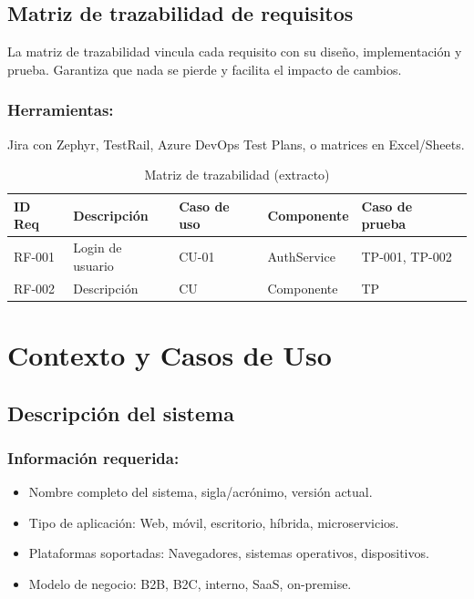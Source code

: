 \documentclass[a4paper,11pt,spanish]{article}
\begin{document}
\subsection{Matriz de trazabilidad de requisitos}

La matriz de trazabilidad vincula cada requisito con su diseño, implementación y prueba. Garantiza que nada se pierde y facilita el impacto de cambios.

\subsubsection*{Herramientas:} Jira con Zephyr, TestRail, Azure DevOps Test Plans, o matrices en Excel/Sheets.

\begin{table}[H]
\centering
\caption{Matriz de trazabilidad (extracto)}
\label{tab:trazabilidad}
\begin{tabular}{@{}lllll@{}}
\toprule
\textbf{ID Req} & \textbf{Descripción} & \textbf{Caso de uso} & \textbf{Componente} & \textbf{Caso de prueba} \\
\midrule
RF-001 & Login de usuario & CU-01 & AuthService & TP-001, TP-002 \\
RF-002 & Descripción & CU & Componente & TP \\
\bottomrule
\end{tabular}
\end{table}

\newpage

\section{Contexto y Casos de Uso}

\subsection{Descripción del sistema}

\subsubsection*{Información requerida:}

\begin{itemize}
    \item Nombre completo del sistema, sigla/acrónimo, versión actual.
    \item Tipo de aplicación: Web, móvil, escritorio, híbrida, microservicios.
    \item Plataformas soportadas: Navegadores, sistemas operativos, dispositivos.
    \item Modelo de negocio: B2B, B2C, interno, SaaS, on-premise.
\end{itemize}
\end{document}
